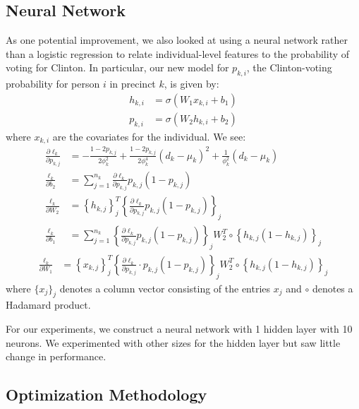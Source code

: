 \documentclass[10pt, letterpaper]{article}
\begin{document}
\begin{multicols}{2}
\subsection{Neural Network} 
As one potential improvement, we also looked at using a neural network rather than a logistic regression to relate individual-level features to the probability of voting for Clinton. In particular, our new model for $p_{k, i}$, the Clinton-voting probability for person $i$ in precinct $k$, is given by: 
\begin{align*}
h_{k, i} &= \sigma\left(W_1 x_{k, i} + b_1 \right) \\
p_{k, i} &= \sigma\left(W_2 h_{k, i} + b_2 \right) 
\end{align*}
where $x_{k, i}$ are the covariates for the individual. We see: 
\begin{align*}
\frac{\partial \ell_k}{\partial p_{k, j}} &= - \frac{1 - 2p_{k, j}}{2 \phi_k^2} + \frac{1 - 2p_{k, j}}{2 \phi_k^4} (d_k - \mu_k)^2  + \frac{1}{\phi_k^2} \left(d_k - \mu_k \right) \\
\frac{\ell_k}{\partial b_2} &= \sum_{j = 1}^{n_k} \frac{\partial \ell_k}{\partial p_{k, j}} p_{k, j} (1 - p_{k, j}) \\
\frac{\ell_k}{\partial W_2} &= \left\{ h_{k, j} \right\}_j^T \left\{ \frac{\partial \ell_k}{\partial p_{k, j}} p_{k, j} (1 - p_{k, j})\right\}_{j} \\
\frac{\ell_k}{\partial b_1} &= \sum_{j = 1}^{n_k} \left\{ \frac{\partial \ell_k}{\partial p_{k, j}} p_{k, j} (1 - p_{k, j})\right\}_{j} W_2^T \circ \left\{ h_{k, j}(1 - h_{k, j})\right\}_j 
\end{align*}
\begin{align*}
\frac{\ell_k}{\partial W_1} &= \left\{ x_{k, j} \right\}_j^T \left\{ \frac{\partial \ell_k}{\partial p_{k, j}} \cdot p_{k, j} (1 - p_{k, j})\right\}_{j} W_2^T \circ \left\{ h_{k, j}(1 - h_{k, j})\right\}_j
\end{align*}
where $\{x_j\}_j$ denotes a column vector consisting of the entries $x_j$ and $\circ$ denotes a Hadamard product.

For our experiments, we construct a neural network with 1 hidden layer with 10 neurons. We experimented with other sizes for the hidden layer but saw little change in performance.

\subsection{Optimization Methodology}


\end{multicols}
\end{document}

